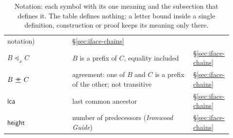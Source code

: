 \documentclass[11pt,a4paper]{article}
\theoremstyle{definition}
\newcommand{\agrees}{\mathrel{\preceq\mkern-9mu\succeq}}
\newcommand{\lca}{\mathsf{lca}}
\begin{document}
\begin{table}[tbp]
\begin{tabular}{@{}p{0.29\linewidth}p{0.52\linewidth}p{0.11\linewidth}@{}}
  notation)
  & \S\ref{sec:iface-chains} \\
$B \preceq_x C$
  & $B$ is a prefix of $C$, equality included
  & \S\ref{sec:iface-chains} \\
$B \agrees C$
  & agreement: one of $B$ and $C$ is a prefix of the other; not transitive
  & \S\ref{sec:iface-chains} \\
$\lca$
  & last common ancestor
  & \S\ref{sec:iface-chains} \\
$\mathsf{height}$
  & number of predecessors (\emph{Ironwood Guide})
  & \S\ref{sec:iface-chains} \\
\bottomrule
\end{tabular}
\caption{Notation: each symbol with its one meaning and the subsection that
defines it. The table defines nothing; a letter bound inside a single
definition, construction or proof keeps its meaning only there.}
\label{tab:notation}
\end{table}
\end{document}
